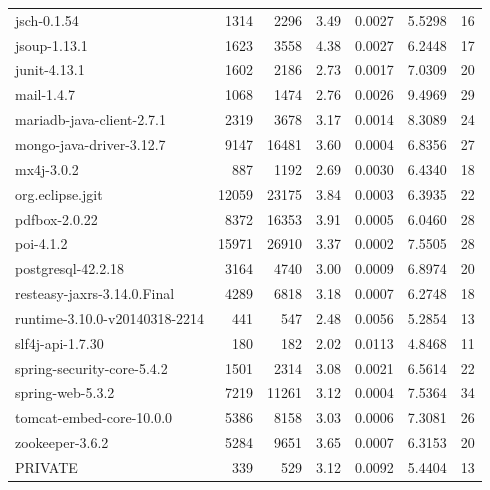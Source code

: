 \documentclass[12pt, a4paper]{article}
\begin{document}
\begin{longtable}[H]{l r r r r r r}
        jsch-0.1.54                   &  1314 &  2296 & 3.49 & 0.0027 & 5.5298 & 16 \\ 
        jsoup-1.13.1                  &  1623 &  3558 & 4.38 & 0.0027 & 6.2448 & 17 \\ 
        junit-4.13.1                  &  1602 &  2186 & 2.73 & 0.0017 & 7.0309 & 20 \\ 
        mail-1.4.7                    &  1068 &  1474 & 2.76 & 0.0026 & 9.4969 & 29 \\ 
        mariadb-java-client-2.7.1     &  2319 &  3678 & 3.17 & 0.0014 & 8.3089 & 24 \\ 
        mongo-java-driver-3.12.7      &  9147 & 16481 & 3.60 & 0.0004 & 6.8356 & 27 \\ 
        mx4j-3.0.2                    &   887 &  1192 & 2.69 & 0.0030 & 6.4340 & 18 \\ 
        org.eclipse.jgit              & 12059 & 23175 & 3.84 & 0.0003 & 6.3935 & 22 \\ 
        pdfbox-2.0.22                 &  8372 & 16353 & 3.91 & 0.0005 & 6.0460 & 28 \\ 
        poi-4.1.2                     & 15971 & 26910 & 3.37 & 0.0002 & 7.5505 & 28 \\ 
        postgresql-42.2.18            &  3164 &  4740 & 3.00 & 0.0009 & 6.8974 & 20 \\ 
        resteasy-jaxrs-3.14.0.Final   &  4289 &  6818 & 3.18 & 0.0007 & 6.2748 & 18 \\ 
        runtime-3.10.0-v20140318-2214 &   441 &   547 & 2.48 & 0.0056 & 5.2854 & 13 \\ 
        slf4j-api-1.7.30              &   180 &   182 & 2.02 & 0.0113 & 4.8468 & 11 \\ 
        spring-security-core-5.4.2    &  1501 &  2314 & 3.08 & 0.0021 & 6.5614 & 22 \\ 
        spring-web-5.3.2              &  7219 & 11261 & 3.12 & 0.0004 & 7.5364 & 34 \\ 
        tomcat-embed-core-10.0.0      &  5386 &  8158 & 3.03 & 0.0006 & 7.3081 & 26 \\ 
        zookeeper-3.6.2               &  5284 &  9651 & 3.65 & 0.0007 & 6.3153 & 20 \\ 
        PRIVATE                       &   339 &   529 & 3.12 & 0.0092 & 5.4404 & 13
\end{longtable}
\end{document}
